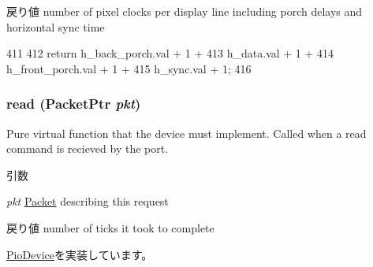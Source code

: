 \begin{DoxyReturn}{戻り値}
number of pixel clocks per display line including porch delays and horizontal sync time 
\end{DoxyReturn}



\begin{DoxyCode}
411                                          {
412         return h_back_porch.val + 1 +
413                h_data.val + 1 +
414                h_front_porch.val + 1 +
415                h_sync.val + 1;
416     }
\end{DoxyCode}
\hypertarget{classHDLcd_a613ec7d5e1ec64f8d21fec78ae8e568e}{
\subsubsection[{read}]{ read ({\bf PacketPtr} {\em pkt})}}
\label{classHDLcd_a613ec7d5e1ec64f8d21fec78ae8e568e}
Pure virtual function that the device must implement. Called when a read command is recieved by the port. 
\begin{DoxyParams}{引数}
\item[{\em pkt}]\hyperlink{classPacket}{Packet} describing this request \end{DoxyParams}
\begin{DoxyReturn}{戻り値}
number of ticks it took to complete 
\end{DoxyReturn}


\hyperlink{classPioDevice_a842312590432036092c422c87a442358}{PioDevice}を実装しています。


